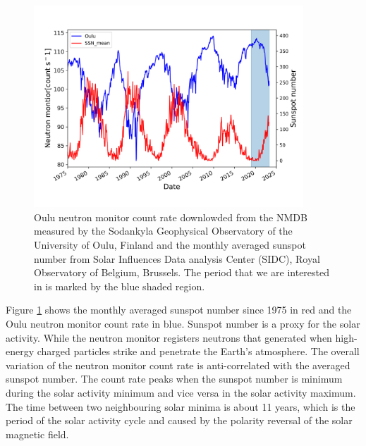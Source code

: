 \begin{figure}[htbp]
	\centering
	\includegraphics[width = 0.9\textwidth]{images/Solar_modulation.png}
	\caption[Sunspot number and Neutron monitor count data]{Oulu neutron monitor count rate downlowded from the \ac{NMDB} measured by the Sodankyla Geophysical Observatory of the University of Oulu, Finland and the monthly averaged sunspot number from Solar Influences Data analysis Center (SIDC), Royal Observatory of Belgium, Brussels. The period that we are interested in is marked by the blue shaded region.}
	\label{Fig:Solar_modulation}
\end{figure}


Figure \ref{Fig:Solar_modulation} shows the monthly averaged sunspot number since 1975 in red and the Oulu neutron monitor count rate in blue.
Sunspot number is a proxy for the solar activity. While the neutron monitor registers neutrons that generated when high-energy charged particles strike and penetrate the Earth's atmosphere. The overall variation of the neutron monitor count rate is anti-correlated with the averaged sunspot number.
The count rate peaks when the sunspot number is minimum during the solar activity minimum and vice versa in the solar activity maximum. The time between two neighbouring solar minima is about 11 years, which is the period of the solar activity cycle and caused by the polarity reversal of the solar magnetic field.

